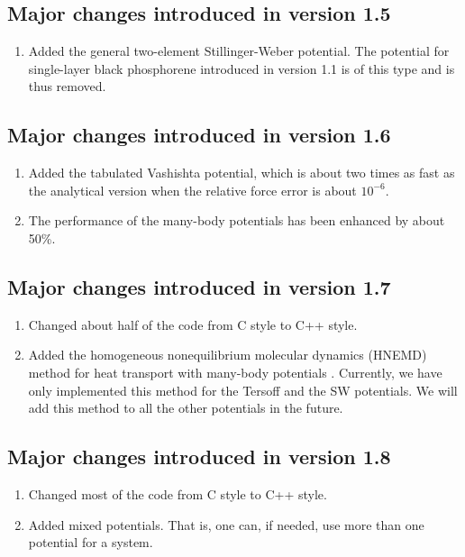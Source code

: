 \documentclass[12pt,a4paper]{report}
\begin{document}
\subsection{Major changes introduced in version 1.5}
\begin{enumerate}
\item Added the general two-element Stillinger-Weber potential. The potential for single-layer black phosphorene introduced in version 1.1 is of this type and is thus removed.
\end{enumerate}

\subsection{Major changes introduced in version 1.6}
\begin{enumerate}
\item Added the tabulated Vashishta potential, which is about two times as fast as the analytical version when the relative force error is about $10^{-6}$.
\item The performance of the many-body potentials has been enhanced by about 50\%.
\end{enumerate}


\subsection{Major changes introduced in version 1.7}
\begin{enumerate}
\item Changed about half of the code from C style to C++ style.
\item Added the homogeneous nonequilibrium molecular dynamics (HNEMD) method for heat transport with many-body potentials \cite{fan2018submitted,xu2018submitted,dong2018submitted}. Currently, we have only implemented this method for the Tersoff and the SW potentials. We will add this method to all the other potentials in the future. 
\end{enumerate}

\subsection{Major changes introduced in version 1.8}
\begin{enumerate}
\item Changed most of the code from C style to C++ style.
\item Added mixed potentials. That is, one can, if needed, use more than one potential for a system.
\end{enumerate}
\end{document}
